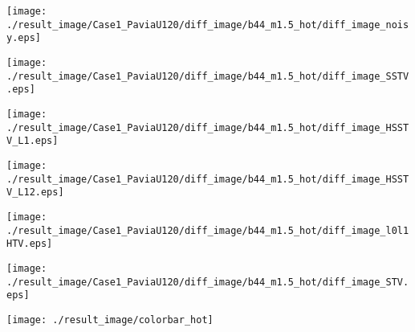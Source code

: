 \begin{figure*}[t]
\begin{center}
		\begin{minipage}{0.125\hsize}
			\centerline{\hspace{\hsize}} %
		\end{minipage}
		\begin{minipage}{0.125\hsize}
			\centerline{\texttt{[image: ./result\_image/Case1\_PaviaU120/diff\_image/b44\_m1.5\_hot/diff\_image\_noisy.eps]}} %
		\end{minipage}
		\begin{minipage}{0.125\hsize}
			\centerline{\texttt{[image: ./result\_image/Case1\_PaviaU120/diff\_image/b44\_m1.5\_hot/diff\_image\_SSTV.eps]}} %
		\end{minipage}
		\begin{minipage}{0.125\hsize}
			\centerline{\texttt{[image: ./result\_image/Case1\_PaviaU120/diff\_image/b44\_m1.5\_hot/diff\_image\_HSSTV\_L1.eps]}} %
		\end{minipage}
		\begin{minipage}{0.125\hsize}
			\centerline{\texttt{[image: ./result\_image/Case1\_PaviaU120/diff\_image/b44\_m1.5\_hot/diff\_image\_HSSTV\_L12.eps]}} %
		\end{minipage}
		\begin{minipage}{0.125\hsize}
			\centerline{\texttt{[image: ./result\_image/Case1\_PaviaU120/diff\_image/b44\_m1.5\_hot/diff\_image\_l0l1HTV.eps]}} %
		\end{minipage}
		\begin{minipage}{0.125\hsize}
			\centerline{\texttt{[image: ./result\_image/Case1\_PaviaU120/diff\_image/b44\_m1.5\_hot/diff\_image\_STV.eps]}} %
		\end{minipage}
		\begin{minipage}{0.050\hsize}
			\centerline{\texttt{[image: ./result\_image/colorbar\_hot]}} %
		\end{minipage}
		
		\vspace{1mm}
		

\end{center}
\end{figure*}
